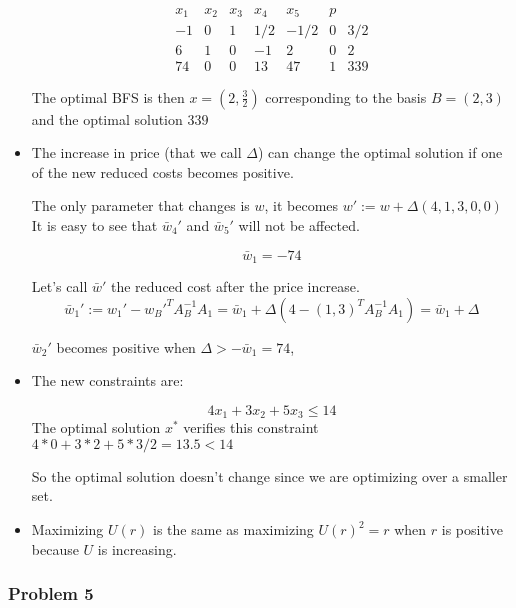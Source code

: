 \documentclass[12pt]{article}
\newcommand{\Q}[1]{\subsubsection*{Problem #1}}
\begin{document}
\begin{itemize}
\[
\begin{array}{c|c|c|c|c|c|c|c}
x_1 & x_2 & x_3 & x_4 & x_5 &p \\
-1 &  0 & 1 & 1/2 & -1/2  & 0 & 3/2    \\
6 & 1 & 0 & -1  & 2 & 0 & 2 \\
74 & 0 & 0 & 13&47  &   1 & 339    
\end{array}
\]

The optimal BFS is then $x = (2, \frac32)$ corresponding to the basis $B = (2,3)$ and the optimal solution $339$

\item
The increase in price (that we call $\Delta$) can change the optimal solution if one of the new reduced costs becomes positive.

The only parameter that changes is $w$, it becomes $w' := w + \Delta (4, 1, 3, 0, 0)$
It is easy to see that $\bar w_4'$ and $\bar w_5'$  will not be affected.


$$\bar w_1 = -74$$


Let's call $\bar w'$ the reduced cost after the price increase.
$$\bar w_1' :=  w_1' - w_B'^T A_B^{-1} A_1 =  \bar w_1 + \Delta (4 - (1, 3)^T A_B^{-1} A_1) = \bar w_1 + \Delta$$


$\bar w_2'$ becomes positive when $\Delta > -\bar w_1 = 74$,


\item
The new constraints are:

$$4x_1 + 3x_2 + 5x_3 \leq 14$$
The optimal solution $x^*$ verifies this constraint
$4 *0 + 3*2 + 5*3/2 = 13.5 < 14$

So the optimal solution doesn't change since we are optimizing over a smaller set.

\item Maximizing $U(r)$ is the same as maximizing $U(r)^2 = r$ when $r$ is positive because $U$ is increasing.

\end{itemize}


\Q{5}
\end{document}
